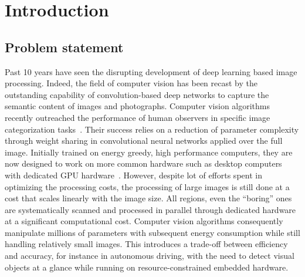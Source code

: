 \section*{Introduction}
\label{sec:intro}
\subsection*{Problem statement}
Past 10 years have seen the disrupting development of deep learning based image processing.
Indeed, the field of computer vision has been recast by the outstanding capability of convolution-based deep networks to capture the semantic content of images and photographs. Computer vision algorithms recently outreached the performance of human observers in specific image categorization tasks~\cite{He15}. Their success relies on a reduction of parameter complexity through weight sharing  in convolutional neural networks applied over the full image.
Initially trained on energy greedy, high performance computers, they are now designed to work on more common hardware such as desktop computers with dedicated GPU hardware~\cite{Sandler18}.
However, despite lot of efforts spent in optimizing the processing costs, the processing of large images is still done at a cost that scales linearly with the image size. All regions, even the “boring” ones are systematically scanned and processed in parallel through dedicated hardware at a significant computational cost.
Computer vision algorithms consequently manipulate millions of parameters with subsequent energy consumption while still handling relatively small images. This introduces a trade-off between efficiency and accuracy, for instance in autonomous driving, with the need to detect visual objects at a glance while running on resource-constrained embedded hardware.

